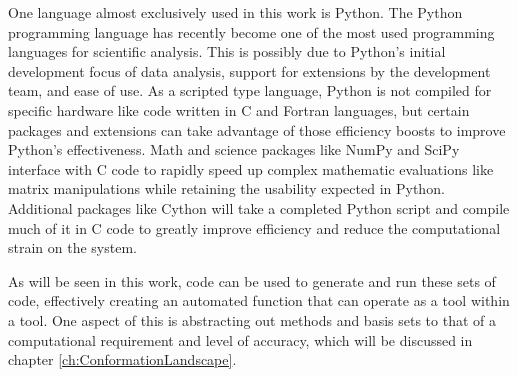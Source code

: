 One language almost exclusively used in this work is Python.\cite{Python} 
The Python programming language has recently become one of the most used programming languages for scientific analysis.
This is possibly due to Python's initial development focus of data analysis, support for extensions by the development team, and ease of use.
As a scripted type language, Python is not compiled for specific hardware like code written in C and Fortran languages, but certain packages and extensions can take advantage of those efficiency boosts to improve Python's effectiveness.
Math and science packages like NumPy\cite{NumPy} and SciPy\cite{SciPy} interface with C code to rapidly speed up complex mathematic evaluations like matrix manipulations while retaining the usability expected in Python.
Additional packages like Cython\cite{Cython} will take a completed Python script and compile much of it in C code to greatly improve efficiency and reduce the computational strain on the system.

As will be seen in this work, code can be used to generate and run these sets of code, effectively creating an automated function that can operate as a tool within a tool. 
One aspect of this is abstracting out methods and basis sets to that of a computational requirement and level of accuracy, which will be discussed in chapter \ref{ch:ConformationLandscape}.















